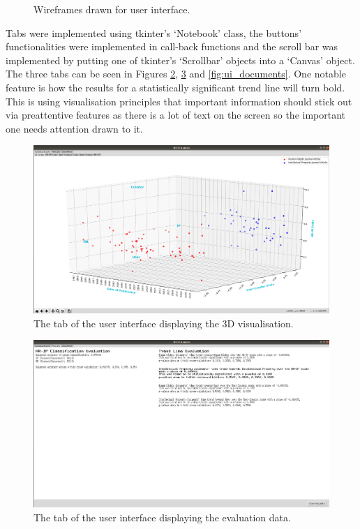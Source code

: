 \begin{figure}
  					\endminipage\hfill
  					\caption{Wireframes drawn for user interface.}\label{fig:ui-wire}
				\end{figure}
				
				Tabs were implemented using tkinter's `Notebook' class, the buttons' functionalities were implemented in call-back functions and the scroll bar was implemented by putting one of tkinter's `Scrollbar' objects into a `Canvas' object. The three tabs can be seen in Figures \ref{fig:ui_3d}, \ref{fig:ui_eval} and \ref{fig:ui_documents}. One notable feature is how the results for a statistically significant trend line will turn bold. This is using visualisation principles that important information should stick out via preattentive features as there is a lot of text on the screen so the important one needs attention drawn to it.
				\begin{figure}
    				\centering
    				\includegraphics[width=0.9\linewidth]{resources/images/ui_3d.png}
    				\caption{The tab of the user interface displaying the 3D visualisation.}
    				\label{fig:ui_3d}
				\end{figure}
				\begin{figure}
    				\centering
    				\includegraphics[width=0.9\linewidth]{resources/images/ui_eval.png}
    				\caption{The tab of the user interface displaying the evaluation data.}
    				\label{fig:ui_eval}
				\end{figure}
